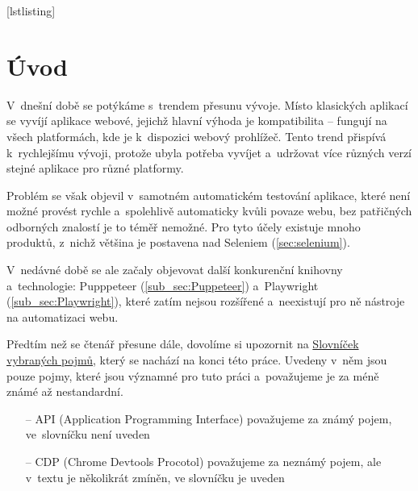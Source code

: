 \documentclass[12pt, a4paper, twoside]{article}
\begin{document}
	
\makeatletter


	[lstlisting]%
	\renewcommand*{\thellabel}{%
		\ifnum\value{llabel}<0 %
		\@ctrerr
		\else
		\ifnum\value{llabel}>10 %
		\@ctrerr
		\else
		\protect\ding{\the\numexpr\value{llabel}+201\relax}%
		\fi
		\fi
	}%

\newlength{\llabelsep}
\setlength{\llabelsep}{5pt}

\newcommand*{\llabel}[1]{%
	\begingroup
	\refstepcounter{llabel}%
	\label{#1}%
	\llap{%
		\thellabel\kern\llabelsep
		\hphantom{\lst@numberstyle\the\lst@lineno}%
		\kern\lst@numbersep
	}%
	\endgroup
}
\makeatother
	
	
	
	
	
	\afterpage{\aftergroup\restoregeometry}
	\tableofcontents
	\onehalfspacing
	\newpage
	\printglossary[title=Seznam nestandardních a~méně známých zkratek, toctitle=Seznam nestandardních a~méně známých zkratek, type=\acronymtype]
	\newpage
	\section{Úvod}
	V~dnešní době se potýkáme s~trendem přesunu vývoje. Místo klasických aplikací se vyvíjí aplikace webové, jejichž hlavní výhoda je kompatibilita -- fungují na všech platformách, kde je k~dispozici webový prohlížeč. Tento trend přispívá k~rychlejšímu vývoji, protože ubyla potřeba vyvíjet a~udržovat více různých verzí stejné aplikace pro různé platformy. 
	
	Problém se však objevil v~samotném automatickém testování aplikace, které není možné provést rychle a~spolehlivě automaticky kvůli povaze webu, bez patřičných odborných znalostí je to téměř nemožné. Pro tyto účely existuje mnoho produktů, z~nichž většina je postavena nad Seleniem (\ref{sec:selenium}). 
	
	V~nedávné době se ale začaly objevovat další konkurenční knihovny a~technologie: Pupppeteer (\ref{sub_sec:Puppeteer}) a~Playwright (\ref{sub_sec:Playwright}), které zatím nejsou rozšířené a~neexistují pro ně nástroje na automatizaci webu.
	
	Předtím než se čtenář přesune dále, dovolíme si upozornit na \hyperref[glossary]{Slovníček vybraných pojmů}, který se nachází na konci této práce. Uvedeny v~něm jsou pouze pojmy, které jsou významné pro tuto práci a~považujeme je za méně známé až nestandardní.
	\begin{itemize}
		\item[--] API (Application Programming Interface) považujeme za známý pojem, ve~slovníčku není uveden
		\item[--] CDP (Chrome Devtools Procotol) považujeme za neznámý pojem, ale v~textu je několikrát zmíněn, ve slovníčku je uveden
	\end{itemize}
\end{document}
